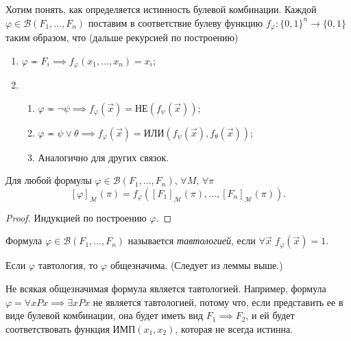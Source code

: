 \documentclass[a4paper, fleqn]{article}
\begin{document}
    Хотим понять, как определяется истинность булевой комбинации.
    Каждой $\varphi \in \mathcal{B}(F_{1}, \ldots, F_{n})$ поставим в соответствие булеву
    функцию $f_{\varphi} \colon \{0, 1\}^{n} \to \{0, 1\}$ таким образом, что (дальше 
    рекурсией по построению)
    \begin{enumerate}
        \item $\varphi \eqcirc F_{i} \implies f_{\varphi}(x_{1}, \ldots, x_{n}) = x_{i}$;
        \item \begin{enumerate}
            \item $\varphi \eqcirc \neg \psi \implies f_{\varphi}(\vec{x}) = 
            \text{НЕ}(f_{\psi}(\vec{x}))$;
            \item $\varphi \eqcirc \psi \lor \theta \implies f_{\varphi}(\vec{x}) = 
            \text{ИЛИ}(f_{\psi}(\vec{x}), f_{\theta}(\vec{x}))$;
            \item Аналогично для других связок.
        \end{enumerate}
    \end{enumerate}
    
    \begin{lemma}
        Для любой формулы $\varphi \in \mathcal{B}(F_{1}, \ldots, F_{n})$, $\forall M$,
         $\forall \pi$
        \[
            [\varphi]_{\mathcal{M}}(\pi) = f_{\varphi}\left([F_{1}]_{\mathcal{M}}(\pi),
             \ldots, [F_{n}]_{\mathcal{M}}(\pi)\right).
        \]
    \end{lemma}
    
    \begin{proof}
        Индукцией по построению $\varphi$.
    \end{proof}
    
    \begin{definition}
        Формула $\varphi \in \mathcal{B}(F_{1}, \ldots, F_{n})$ называется {\it тавтологией}, если $\forall \vec{x}$ $f_{\varphi}(\vec{x}) = 1$.
    \end{definition}
    
    \begin{proposal}
        Если $\varphi$ тавтология, то $\varphi$ общезначима. 
        (Следует из леммы выше.)
    \end{proposal}
    
    Не всякая общезначимая формула является тавтологией.
    Например, формула $\varphi = \forall x Px \implies \exists x Px$ не является 
    тавтологией, потому что, если представить ее в виде булевой комбинации, она будет 
    иметь вид $F_{1} \implies F_{2}$, и ей будет соответствовать функция 
    $\text{ИМП}(x_{1}, x_{2})$, которая не всегда истинна.
    
\end{document}
